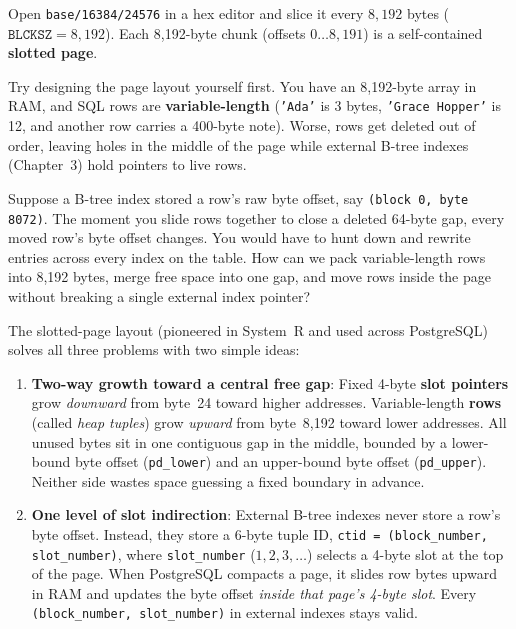 Open \texttt{base/16384/24576} in a hex editor and slice it every $8{,}192$ bytes ($\texttt{BLCKSZ} = 8{,}192$). Each 8,192-byte chunk (offsets $0 \dots 8{,}191$) is a self-contained \textbf{slotted page}.

\begin{walkbox}
Try designing the page layout yourself first. You have an 8,192-byte array in RAM, and SQL rows are \textbf{variable-length} (\texttt{'Ada'} is 3 bytes, \texttt{'Grace Hopper'} is 12, and another row carries a 400-byte note). Worse, rows get deleted out of order, leaving holes in the middle of the page while external B-tree indexes (Chapter~3) hold pointers to live rows.

Suppose a B-tree index stored a row's raw byte offset, say \texttt{(block 0, byte 8072)}. The moment you slide rows together to close a deleted 64-byte gap, every moved row's byte offset changes. You would have to hunt down and rewrite entries across every index on the table. How can we pack variable-length rows into 8,192 bytes, merge free space into one gap, and move rows inside the page without breaking a single external index pointer?
\end{walkbox}

The slotted-page layout (pioneered in System~R and used across PostgreSQL) solves all three problems with two simple ideas:
\begin{enumerate}
  \item \textbf{Two-way growth toward a central free gap}: Fixed 4-byte \textbf{slot pointers} grow \emph{downward} from byte~24 toward higher addresses. Variable-length \textbf{rows} (called \emph{heap tuples}) grow \emph{upward} from byte~8,192 toward lower addresses. All unused bytes sit in one contiguous gap in the middle, bounded by a lower-bound byte offset (\texttt{pd\_lower}) and an upper-bound byte offset (\texttt{pd\_upper}). Neither side wastes space guessing a fixed boundary in advance.
  \item \textbf{One level of slot indirection}: External B-tree indexes never store a row's byte offset. Instead, they store a 6-byte tuple ID, \texttt{ctid = (block\_number, slot\_number)}, where \texttt{slot\_number} ($1, 2, 3, \dots$) selects a 4-byte slot at the top of the page. When PostgreSQL compacts a page, it slides row bytes upward in RAM and updates the byte offset \emph{inside that page's 4-byte slot}. Every \texttt{(block\_number, slot\_number)} in external indexes stays valid.
\end{enumerate}


